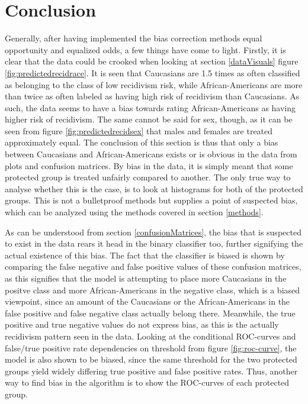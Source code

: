 \documentclass[11pt, fleqn, titlepage]{article}
\begin{document}
	\section{Conclusion} \label{conclusion}
	Generally, after having implemented the bias correction methods equal opportunity and equalized odds, a few things have come to light. Firstly, it is clear that the data could be crooked when looking at section \ref{dataVisuals} figure \ref{fig:predictedrecidrace}. It is seen that Caucasians are 1.5 times as often classified as belonging to the class of low recidivism risk, while African-Americans are more than twice as often labeled as having high risk of recidivism than Caucasians. As such, the data seems to have a bias towards rating African-Americans as having higher risk of recidivism. The same cannot be said for sex, though, as it can be seen from figure \ref{fig:predictedrecidsex} that males and females are treated approximately equal. The conclusion of this section is thus that only a bias between Caucasians and African-Americans exists or is obvious in the data from plots and confusion matrices. By bias in the data, it is simply meant that some protected group is treated unfairly compared to another. The only true way to analyse whether this is the case, is to look at histograms for both of the protected groups. This is not a bulletproof methods but supplies a point of suspected bias, which can be analyzed using the methods covered in section \ref{methods}.
	
	As can be understood from section \ref{confusionMatrices}, the bias that is suspected to exist in the data rears it head in the binary classifier too, further signifying the actual existence of this bias. The fact that the classifier is biased is shown by comparing the false negative and false positive values of these confusion matrices, as this signifies that the model is attempting to place more Caucasians in the positve class and more African-Americans in the negative class, which is a biased viewpoint, since an amount of the Caucasians or the African-Americans in the false positive and false negative class actually belong there. Meanwhile, the true positive and true negative values do not express bias, as this is the actually recidivism pattern seen in the data. Looking at the conditional ROC-curves and false/true positive rate dependencies on threshold from figure \ref{fig:roc-curve}, the model is also shown to be biased, since the same threshold for the two protected groups yield widely differing true positive and false positive rates. Thus, another way to find bias in the algorithm is to show the ROC-curves of each protected group.
	
\end{document}

